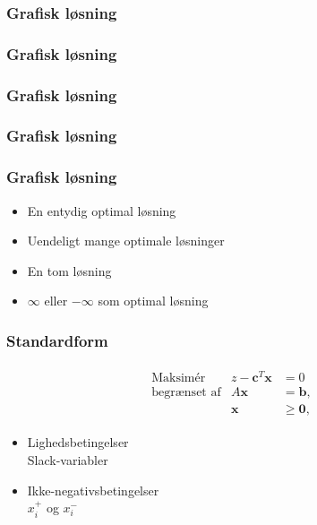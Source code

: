 \begin{frame}
\frametitle{Grafisk løsning}

\end{frame}

\begin{frame}
\frametitle{Grafisk løsning}

\end{frame}

\begin{frame}
\frametitle{Grafisk løsning}

\end{frame}

\begin{frame}
\frametitle{Grafisk løsning}

\end{frame}

\begin{frame}
\frametitle{Grafisk løsning}
\begin{itemize}
\item En entydig optimal løsning
\item Uendeligt mange optimale løsninger 
\item En tom løsning
\item $\infty$ eller $-\infty$ som optimal løsning  
\end{itemize}
\end{frame}

\begin{frame}
\frametitle{Standardform}
\begin{align*}
\begin{array}{lrl}
\text{Maksimér}		&z - \textbf{c}^T\textbf{x}	&	=0		\\
\text{begrænset af}	&A\textbf{x}	&=\mathbf{b},	\\
					&\mathbf{x}				&\geq \mathbf{0},
\end{array}
\end{align*}
\begin{itemize}
\item Lighedsbetingelser \\
 		Slack-variabler
\item Ikke-negativsbetingelser \\ 
		$x_i^+$ og $x_i^-$
\end{itemize}
\end{frame}

